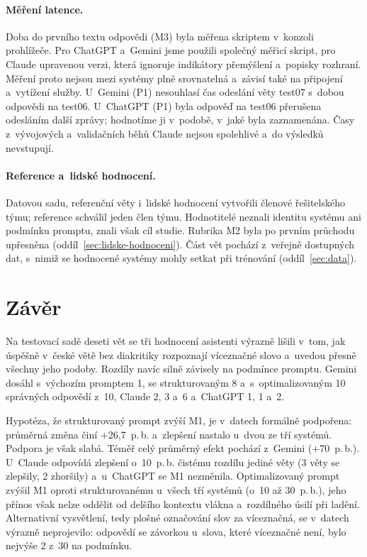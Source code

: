 \documentclass[11pt,a4paper]{article}
\begin{document}
\paragraph{Měření latence.}
Doba do prvního textu odpovědi (M3) byla měřena skriptem v~konzoli
prohlížeče. Pro ChatGPT a~Gemini jsme použili společný měřicí skript,
pro Claude upravenou verzi, která ignoruje indikátory přemýšlení
a~popisky rozhraní. Měření proto nejsou mezi systémy plně srovnatelná
a~závisí také na připojení a~vytížení služby. U~Gemini (P1) nesouhlasí
čas odeslání věty test07 s~dobou odpovědi na test06. U~ChatGPT (P1)
byla odpověď na test06 přerušena odesláním další zprávy; hodnotíme ji
v~podobě, v~jaké byla zaznamenána. Časy z~vývojových a~validačních běhů
Claude nejsou spolehlivé a~do výsledků nevstupují.

\paragraph{Reference a~lidské hodnocení.}
Datovou sadu, referenční věty i~lidské hodnocení vytvořili členové
řešitelského týmu; reference schválil jeden člen týmu. Hodnotitelé
neznali identitu systému ani podmínku promptu, znali však cíl studie.
Rubrika M2 byla po prvním průchodu upřesněna
(oddíl~\ref{sec:lidske-hodnoceni}). Část vět pochází z~veřejně dostupných
dat, s~nimiž se hodnocené systémy mohly setkat při trénování
(oddíl~\ref{sec:data}).

\section{Závěr}
\label{sec:zaver}

Na testovací sadě deseti vět se tři hodnocení asistenti výrazně lišili
v~tom, jak úspěšně v~české větě bez diakritiky rozpoznají víceznačné
slovo a~uvedou přesně všechny jeho podoby. Rozdíly navíc silně závisely
na podmínce promptu. Gemini dosáhl s~výchozím promptem 1, se
strukturovaným 8 a~s~optimalizovaným 10 správných odpovědí z~10,
Claude 2, 3 a~6 a~ChatGPT 1, 1 a~2.

Hypotéza, že strukturovaný prompt zvýší M1, je v~datech formálně
podpořena: průměrná změna činí $+$26,7~p.\,b. a~zlepšení nastalo
u~dvou ze tří systémů. Podpora je však slabá. Téměř celý průměrný
efekt pochází z~Gemini ($+$70~p.\,b.). U~Claude odpovídá zlepšení
o~10~p.\,b. čistému rozdílu jediné věty (3 věty se zlepšily, 2
zhoršily) a~u~ChatGPT se M1 nezměnila. Optimalizovaný prompt zvýšil
M1 oproti strukturovanému u~všech tří systémů (o~10 až 30~p.\,b.),
jeho přínos však nelze oddělit od delšího kontextu vlákna a~rozdílného
úsilí při ladění. Alternativní vysvětlení, tedy plošné označování slov
za víceznačná, se v~datech výrazně neprojevilo: odpovědí se závorkou
u~slova, které víceznačné není, bylo nejvýše 2 z~30 na podmínku.
\end{document}
